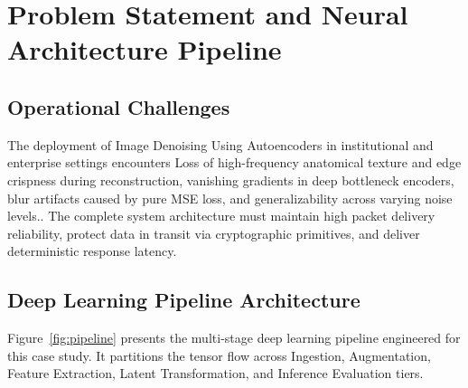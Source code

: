 \section{Problem Statement and Neural Architecture Pipeline}

\subsection{Operational Challenges}
The deployment of Image Denoising Using Autoencoders in institutional and enterprise settings encounters Loss of high-frequency anatomical texture and edge crispness during reconstruction, vanishing gradients in deep bottleneck encoders, blur artifacts caused by pure MSE loss, and generalizability across varying noise levels.. The complete system architecture must maintain high packet delivery reliability, protect data in transit via cryptographic primitives, and deliver deterministic response latency.

\subsection{Deep Learning Pipeline Architecture}
Figure~\ref{fig:pipeline} presents the multi-stage deep learning pipeline engineered for this case study. It partitions the tensor flow across Ingestion, Augmentation, Feature Extraction, Latent Transformation, and Inference Evaluation tiers.

